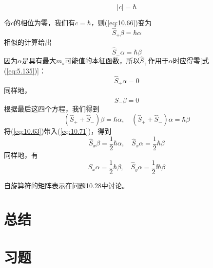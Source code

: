     \begin{equation*}
        \left|c\right| = \hbar
    \end{equation*}
    
    令$c$的相位为零，我们有$c = \hbar$，则(\ref{eq:10.66})变为
    \begin{equation}
        \hat{S}_+ \beta = \hbar \alpha
        \label{eq:10.69}
    \end{equation}
    相似的计算给出
    \begin{equation}
        \hat{S}_- \alpha = \hbar \beta
        \label{eq:10.70}
    \end{equation}
    因为$\alpha$是具有最大$m_s$可能值的本征函数，所以$\hat{S}_+$作用于$\alpha$时应得零[式(\ref{eq:5.135})]：
    \begin{equation*}
        \hat{S}_+ \alpha = 0
    \end{equation*}
    同样地，
    \begin{equation*}
        \hat{S}_- \beta = 0
    \end{equation*}
    根据最后这四个方程，我们得到
    \begin{equation}
        \left(\hat{S}_+ + \hat{S}_-\right)\beta = \hbar \alpha, \quad \left(\hat{S}_+ + \hat{S}_-\right)\alpha = \hbar \beta
        \label{eq:10.71}
    \end{equation}
    将(\ref{eq:10.63})带入(\ref{eq:10.71})，得到
    \begin{equation}
        \hat{S}_x \beta = \frac{1}{2}\hbar \alpha, \quad \hat{S}_x \alpha = \frac{1}{2}\hbar \beta
        \label{eq:10.72}
    \end{equation}
    同样地，有
    \begin{equation}
        \hat{S}_x \alpha = \frac{1}{2}\hbar \beta, \quad \hat{S}_y \alpha = \frac{1}{2}\ii \hbar \beta
        \label{eq:10.73}
    \end{equation}
    
    自旋算符的矩阵表示在问题10.28中讨论。

\section*{总结}

\section*{习题}